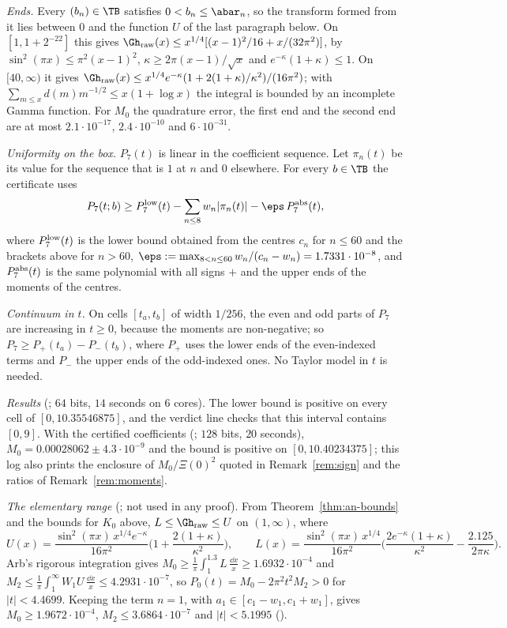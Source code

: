 \emph{Ends.} Every $(b_n)\in\TB$ satisfies $0<b_n\le\abar_n$, so the transform formed from it lies between $0$ and the function $U$ of the last
paragraph below. On
$[1,1+2^{-22}]$ this gives $\Gh_{\rm raw}(x)\le x^{1/4}[(x-1)^2/16+x/(32\pi^2)]$, by $\sin^2(\pi x)\le\pi^2(x-1)^2$, $\kappa\ge2\pi(x-1)/\sqrt x$ and
$e^{-\kappa}(1+\kappa)\le1$. On $[40,\infty)$ it gives $\Gh_{\rm raw}(x)\le x^{1/4}e^{-\kappa}(1+2(1+\kappa)/\kappa^2)/(16\pi^2)$; with
$\sum_{m\le x}d(m)m^{-1/2}\le x(1+\log x)$ the integral is bounded by an incomplete Gamma function. For $M_0$ the quadrature error, the first end and the second end are at most $2.1\cdot10^{-17}$, $2.4\cdot10^{-10}$ and
$6\cdot10^{-31}$.

\emph{Uniformity on the box.} $P_7(t)$ is linear in the coefficient sequence. Let $\pi_n(t)$ be its value for the sequence that is $1$ at $n$ and
$0$ elsewhere. For every $b\in\TB$ the certificate uses
\[
P_7(t;b)\ge P_7^{\rm low}(t)-\sum_{n\le8}w_n|\pi_n(t)|-\eps\,P_7^{\rm abs}(t),
\]
where $P_7^{\rm low}(t)$ is the lower bound obtained from the centres $c_n$ for $n\le60$ and the brackets above for $n>60$,
$\eps:=\max_{8<n\le60}w_n/(c_n-w_n)=1.7331\cdot10^{-8}$, and $P_7^{\rm abs}(t)$ is the same polynomial with all signs $+$ and the upper ends of the
moments of the centres.

\emph{Continuum in $t$.} On cells $[t_a,t_b]$ of width $1/256$, the even and odd parts of $P_7$ are increasing in $t\ge0$, because the moments are
non-negative; so $P_7\ge P_+(t_a)-P_-(t_b)$, where $P_+$ uses the lower ends of the even-indexed terms and $P_-$ the upper ends of the
odd-indexed ones. No Taylor model in $t$ is needed.

\emph{Results} (; $64$ bits, $14$ seconds on $6$ cores). The lower bound is positive on every cell of
$[0,10.35546875]$, and the verdict line checks that this interval contains $[0,9]$. With the certified coefficients
(; $128$ bits, $20$ seconds), $M_0=0.00028062\pm4.3\cdot10^{-9}$ and the bound is positive on
$[0,10.40234375]$; this log also prints the enclosure of $M_0/\Xi(0)^2$ quoted in Remark~\ref{rem:sign} and the ratios of Remark~\ref{rem:moments}.

\emph{The elementary range} (; not used in any proof). From Theorem~\ref{thm:an-bounds} and the bounds for $K_0$
above, $L\le\Gh_{\rm raw}\le U$ on $(1,\infty)$, where
\[
U(x)=\frac{\sin^2(\pi x)\,x^{1/4}e^{-\kappa}}{16\pi^2}\Big(1+\frac{2(1+\kappa)}{\kappa^2}\Big),\qquad
L(x)=\frac{\sin^2(\pi x)\,x^{1/4}}{16\pi^2}\Big(\frac{2e^{-\kappa}(1+\kappa)}{\kappa^2}-\frac{2.125}{2\pi\kappa}\Big).
\]
Arb's rigorous integration gives $M_0\ge\frac1\pi\int_1^{1.3}L\,\frac{\dd x}x\ge1.6932\cdot10^{-4}$ and
$M_2\le\frac1\pi\int_1^\infty W_1U\,\frac{\dd x}x\le4.2931\cdot10^{-7}$, so $P_0(t)=M_0-2\pi^2t^2M_2>0$ for $|t|<4.4699$. Keeping the term $n=1$, with
$a_1\in[c_1-w_1,c_1+w_1]$, gives $M_0\ge1.9672\cdot10^{-4}$, $M_2\le3.6864\cdot10^{-7}$ and $|t|<5.1995$ ().

